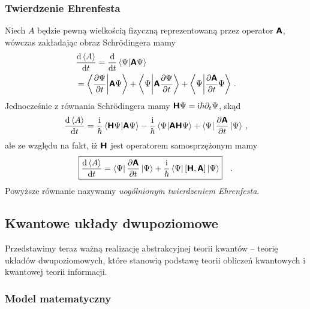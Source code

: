 \documentclass{myclass}
\begin{document}
\subsubsection{Twierdzenie Ehrenfesta}

Niech \(A\) będzie pewną wielkością fizyczną reprezentowaną przez operator \(\boldsymbol{\mathsf{A}}\), wówczas
zakładając obraz Schr\"{o}dingera mamy
\begin{equation*}
    \begin{split}
        &\dv{\expectationvalue{A}}{t} = \dv{}{t} \braket{\Psi}{\oper{A}\Psi} \\
        &= \braket{\pdv{\Psi}{t}}{\oper{A}\Psi} + \braket{\Psi}{\oper{A}\pdv{\Psi}{t}} + \braket{\Psi}{\pdv{\oper{A}}{t}\Psi}\,.
    \end{split}
\end{equation*}
Jednocześnie z równania Schr\"{o}dingera mamy \(\boldsymbol{\mathsf{H}}\Psi=\mathrm{i}\hbar{\partial_t\Psi}\), skąd
\begin{equation*}
    \dv{\expectationvalue{A}}{t} = \frac{\im}{\hbar}\braket{\oper{H}\Psi}{\oper{A}\Psi} - \frac{\im}{\hbar}\braket{\Psi}{\oper{A}\oper{H}\Psi} + \bra{\Psi}\pdv{\oper{A}}{t}\ket{\Psi}\,,
\end{equation*}
ale ze względu na fakt, iż \(\boldsymbol{\mathsf{H}}\) jest operatorem samosprzężonym mamy
\begin{equation*}
    \boxed{
    \dv{\expectationvalue{A}}{t} = \bra{\Psi}\pdv{\oper{A}}{t}\ket{\Psi} + \frac{\im}{\hbar}\bra{\Psi}[\oper{H},\oper{A}]\ket{\Psi}
    }\quad.
\end{equation*}
Powyższe równanie nazywamy \textit{uogólnionym twierdzeniem Ehrenfesta}.

\subsection{Kwantowe układy dwupoziomowe}

Przedstawimy teraz ważną realizację abstrakcyjnej teorii kwantów -- teorię układów dwupoziomowych,
które stanowią podstawę teorii obliczeń kwantowych i kwantowej teorii informacji.

\subsubsection{Model matematyczny}
\end{document}
